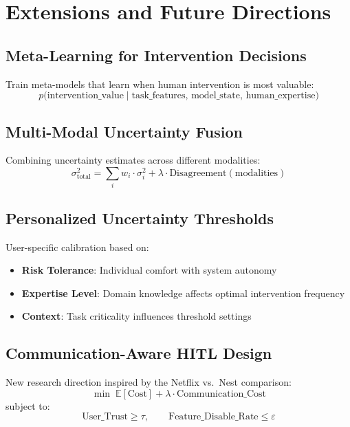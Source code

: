\section{Extensions and Future Directions}

\subsection{Meta-Learning for Intervention Decisions}

Train meta-models that learn when human intervention is most valuable:
\[
p\bigl(\text{intervention\_value} \mid \text{task\_features},\,
       \text{model\_state},\, \text{human\_expertise}\bigr)
\]

\subsection{Multi-Modal Uncertainty Fusion}

Combining uncertainty estimates across different modalities:
\[
\sigma^2_{\text{total}} = \sum_{i} w_i \cdot \sigma^2_i + \lambda \cdot \text{Disagreement}(\text{modalities})
\]

\subsection{Personalized Uncertainty Thresholds}

User-specific calibration based on:
\begin{itemize}
    \item \textbf{Risk Tolerance}: Individual comfort with system autonomy
    \item \textbf{Expertise Level}: Domain knowledge affects optimal intervention frequency
    \item \textbf{Context}: Task criticality influences threshold settings
\end{itemize}

\subsection{Communication-Aware HITL Design}

New research direction inspired by the Netflix vs.\ Nest comparison:
\[
\min\; \mathbb{E}[\text{Cost}] + \lambda \cdot \text{Communication\_Cost}
\]
subject to:
\[
\text{User\_Trust} \geq \tau, \qquad \text{Feature\_Disable\_Rate} \leq \varepsilon
\]

